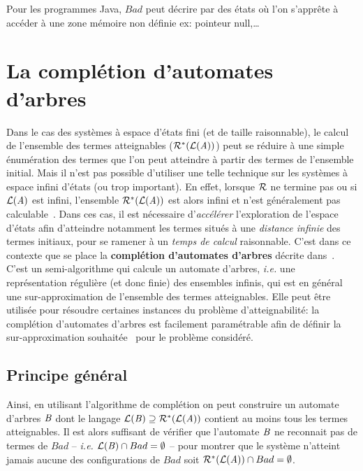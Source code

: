 Pour les programmes Java, $Bad$ peut décrire par des états où l'on
s'apprête à accéder à une zone mémoire non définie ex: pointeur null,\dots

\section{La complétion d'automates d'arbres}
\label{sec:completion}
Dans le cas des systèmes à espace d'états fini (et de taille
raisonnable), le calcul de l'ensemble des termes atteignables
($\mathcal R^*(\mathcal{L}(\mathit A))$) peut se réduire à une simple énumération des
termes que l'on peut atteindre à partir des termes de l'ensemble
initial.  Mais il n'est pas possible d'utiliser une telle
technique sur les systèmes à espace infini d'états (ou trop
important). En effet, lorsque $\mathcal R$ ne termine pas ou si 
$\mathcal{L}(\mathit A)$ est infini, l'ensemble $\mathcal R^*(\mathcal{L}(\mathit A))$ est
alors infini et n'est généralement pas calculable~\cite{GilleronTison-FI95}.
Dans ces cas, il est nécessaire d'\textit{accélérer} l'exploration de
l'espace d'états afin d'atteindre notamment les termes situés à une
\textit{distance infinie} des termes initiaux, pour se ramener à un 
\textit{temps de calcul} raisonnable.
C'est dans ce contexte que se place la \textbf{complétion d'automates d'arbres}
décrite dans~\cite{Genet-RTA98,FeuilladeGVTT-JAR04}.
C'est un semi-algorithme qui calcule un automate d'arbres, \textit{i.e.} une représentation
régulière (et donc finie) des ensembles infinis, qui est en général
une sur-approximation de l'ensemble des termes atteignables.
Elle peut être utilisée pour résoudre certaines instances du problème d'atteignabilité:
la complétion d'automates d'arbres est facilement paramétrable afin de définir 
la sur-approximation souhaitée~\cite{Genet-RTA98,FeuilladeGVTT-JAR04,Takai-RTA04}
pour le problème considéré.

\subsection{Principe général}

Ainsi, en utilisant l'algorithme de complétion on peut construire un
automate d'arbres $\mathit B$ dont le langage $\mathcal{L}(\mathit B) \supseteq
\mathcal R^*(\mathcal{L}(\mathit A))$ contient au moins tous les termes atteignables.  Il
est alors suffisant de vérifier que l'automate $\mathit B$ ne reconnait pas
de termes de $Bad$ -- \textit{i.e.} $\mathcal{L}(\mathit B)\cap Bad = \emptyset$ --
pour montrer que le système n'atteint jamais aucune des configurations
de $Bad$ soit $\mathcal R^*(\mathcal{L}(\mathit A))\cap Bad=\emptyset$.


